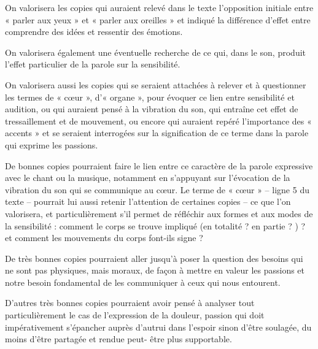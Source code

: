 		{On valorisera les copies qui auraient relevé dans le texte l’opposition initiale entre
« parler aux yeux » et « parler aux oreilles » et indiqué la différence d’effet entre
comprendre des idées et ressentir des émotions.

On valorisera également une éventuelle recherche de ce qui, dans le son, produit l’effet
particulier de la parole sur la sensibilité.

On valorisera aussi les copies qui se seraient attachées à relever et à questionner les
termes de « cœur », d’« organe », pour évoquer ce lien entre sensibilité et audition, ou
qui auraient pensé à la vibration du son, qui entraîne cet effet de tressaillement et de
mouvement, ou encore qui auraient repéré l’importance des « accents » et se seraient
interrogées sur la signification de ce terme dans la parole qui exprime les passions.

De bonnes copies pourraient faire le lien entre ce caractère de la parole expressive
avec le chant ou la musique, notamment en s’appuyant sur l’évocation de la vibration
du son qui se communique au cœur. Le terme de « cœur » – ligne 5 du texte – pourrait
lui aussi retenir l’attention de certaines copies – ce que l’on valorisera, et
particulièrement s’il permet de réfléchir aux formes et aux modes de la sensibilité :
comment le corps se trouve impliqué (en totalité ? en partie ? ) ? et comment les
mouvements du corps font-ils signe ?

De très bonnes copies pourraient aller jusqu’à poser la question des besoins qui ne
sont pas physiques, mais moraux, de façon à mettre en valeur les passions et notre
besoin fondamental de les communiquer à ceux qui nous entourent.

D’autres très bonnes copies pourraient avoir pensé à analyser tout particulièrement le
cas de l’expression de la douleur, passion qui doit impérativement s’épancher auprès
d’autrui dans l’espoir sinon d’être soulagée, du moins d’être partagée et rendue peut-
être plus supportable.}%
